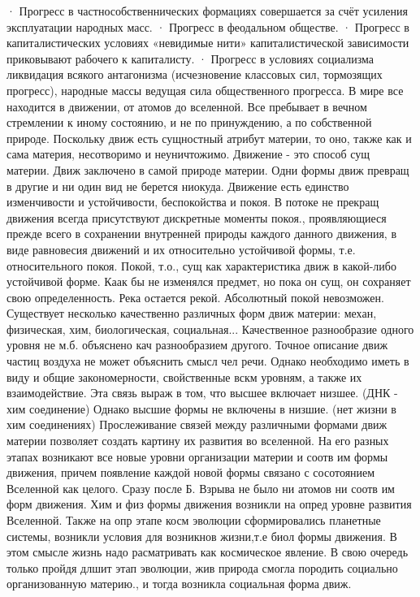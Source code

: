 \documentclass[12pt]{article}
\begin{document}
· Прогресс в частнособственнических формациях совершается за счёт усиления эксплуатации народных масс.
· Прогресс в феодальном обществе.
· Прогресс в капиталистических условиях «невидимые нити» капиталистической зависимости приковывают
рабочего к капиталисту.
· Прогресс в условиях социализма ликвидация всякого антагонизма (исчезновение классовых сил, тормозящих
прогресс), народные массы ведущая сила общественного прогресса.
В мире все находится в движении, от атомов до вселенной. Все пребывает в вечном стремлении к иному
состоянию, и не по принуждению, а по собственной природе. Поскольку движ есть сущностный атрибут
материи, то оно, также как и сама материя, несотворимо и неуничтожимо. Движение - это способ сущ материи.
Движ заключено в самой природе материи. Одни формы движ превращ в другие и ни один вид не берется
ниокуда. 
Движение есть единство изменчивости и устойчивости, беспокойства и покоя. В потоке не прекращ движения
всегда присутствуют дискретные моменты покоя., проявляющиеся прежде всего в сохранении внутренней
природы каждого данного движения, в виде равновесия движений и их относительно устойчивой формы, т.е.
относительного покоя. Покой, т.о., сущ как характеристика движ в какой-либо устойчивой форме. Каак бы не
изменялся предмет, но пока он сущ, он сохраняет свою определенность. Река остается рекой.
Абсолютный покой невозможен.
Существует несколько качественно различных форм движ материи: механ, физическая, хим, биологическая,
социальная... Качественное разнообразие одного уровня не м.б. объяснено кач разнообразием другого. Точное
описание движ частиц воздуха не может объяснить смысл чел речи. Однако необходимо иметь в виду и общие
закономерности, свойственные вскм уровням, а также их взаимодействие. Эта связь выраж в том, что высшее
включает низшее. (ДНК - хим соединение) Однако высшие формы не включены в низшие. (нет жизни в хим
соединениях)
Прослеживание связей между различными формами движ материи позволяет создать картину их развития во
вселенной. На его разных этапах возникают все новые уровни организации материи и соотв им формы
движения, причем появление каждой новой формы связано с сосотоянием Вселенной как целого. Сразу после Б.
Взрыва не было ни атомов ни соотв им форм движения. Хим и физ формы движения возникли на опред уровне
развития Вселенной. Также на опр этапе косм эволюции сформировались планетные системы, возникли
условия для возникнов жизни,т.е биол формы движения. В этом смысле жизнь надо расматривать как
космическое явление. В свою очередь только пройдя длшит этап эволюции, жив природа смогла породить
социально организованную материю., и тогда возникла социальная форма движ.
\end{document}
